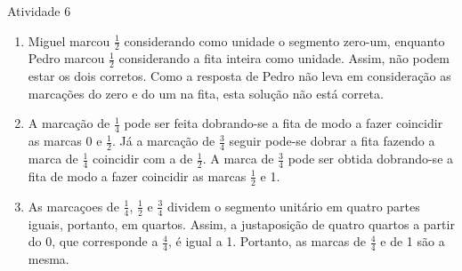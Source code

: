 \documentclass[oneside]{book}
\begin{document}
\begin{multicols}{2}
\begin{resposta*}{Atividade 6}

\begin{enumerate} [\quad a)] %
    \item       Miguel marcou       $\frac{1}{2}$       considerando como unidade o segmento zero-um, enquanto Pedro marcou       $\frac{1}{2}$       considerando a fita inteira como unidade. Assim, não podem estar os dois corretos. Como a resposta de Pedro não leva em consideração as marcações do zero e do um na fita, esta solução não está correta.
    
    \item       A marcação de       $\frac{1}{4}$       pode ser feita dobrando-se a fita de modo a fazer coincidir as marcas 0 e        $\frac{1}{2}$. Já a marcação de       $\frac{3}{4}$       seguir pode-se dobrar a fita fazendo a marca de       $\frac{1}{4}$       coincidir com a de       $\frac{1}{2}$. A marca de       $\frac{3}{4}$       pode ser obtida dobrando-se a fita de modo a fazer coincidir as marcas       $\frac{1}{2}$       e 1. 


    \item       As marcaçoes de       $\frac{1}{4}$,        $\frac{1}{2}$       e       $\frac{3}{4}$       dividem o segmento unitário em quatro partes iguais, portanto, em quartos. Assim, a justaposição de quatro quartos a partir do 0, que corresponde a       $\frac{4}{4}$, é igual a 1.  Portanto, as marcas de       $\frac{4}{4}$       e de 1 são a mesma.
 
    

\end{enumerate}
\end{resposta*}
\end{multicols}
\end{document}
